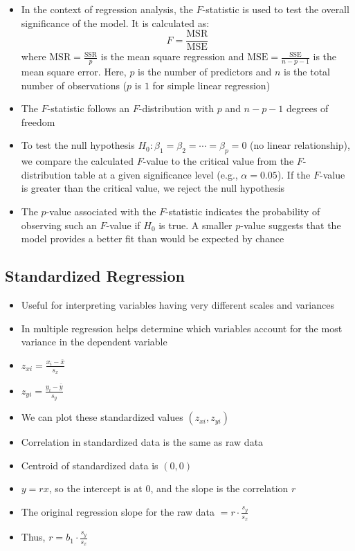\documentclass{article}
\begin{document}
\begin{itemize}
    \item In the context of regression analysis, the \( F \)-statistic is used to test the overall significance of the model. It is calculated as:
    \[
    F = \frac{\text{MSR}}{\text{MSE}}
    \]
    where \(\text{MSR} = \frac{\text{SSR}}{p}\) is the mean square regression and \(\text{MSE} = \frac{\text{SSE}}{n - p - 1}\) is the mean square error. Here, \( p \) is the number of predictors and \( n \) is the total number of observations ($p$ is $1$ for simple linear regression)
    \item The \( F \)-statistic follows an \( F \)-distribution with \( p \) and \( n - p - 1 \) degrees of freedom
    \item To test the null hypothesis \( H_0: \beta_1 = \beta_2 = \cdots = \beta_p = 0 \) (no linear relationship), we compare the calculated \( F \)-value to the critical value from the \( F \)-distribution table at a given significance level (e.g., \(\alpha = 0.05\)). If the \( F \)-value is greater than the critical value, we reject the null hypothesis
    \item The $p$-value associated with the $F$-statistic indicates the probability of observing such an $F$-value if $H_0$ is true. A smaller $p$-value suggests that the model provides a better fit than would be expected by chance
\end{itemize}

\subsection{Standardized Regression}

\begin{itemize}
    \item Useful for interpreting variables having very different scales and variances
    \item In multiple regression helps determine which variables account for the most variance in the dependent variable
    \item $z_{xi}=\frac{x_i-\bar{x}}{s_x}$
    \item $z_{yi}=\frac{y_i-\bar{y}}{s_y}$
    \item We can plot these standardized values $(z_{xi}, z_{yi})$
    \item Correlation in standardized data is the same as raw data
    \item Centroid of standardized data is $(0,0)$
    \item $y=rx$, so the intercept is at $0$, and the slope is the correlation $r$
    \item The original regression slope for the raw data $=r \cdot \frac{s_y}{s_x}$
    \item Thus, $r=b_1 \cdot \frac{s_y}{s_x}$
\end{itemize}
\end{document}
